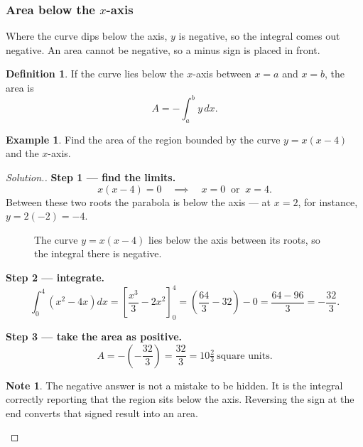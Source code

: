 \documentclass[11pt,a4paper]{article}
\theoremstyle{definition}
\newtheorem{definition}[thm]{Definition}
\newtheorem{example}[thm]{Example}
\newtheorem{note}[thm]{Note}
\newenvironment{solution}
  {\renewcommand{\qedsymbol}{}\begin{proof}[\textit{Solution}.]}
  {\end{proof}}
\begin{document}
\subsubsection{Area below the $x$-axis}

Where the curve dips below the axis, $y$ is negative, so the integral comes out
negative. An area cannot be negative, so a minus sign is placed in front.

\begin{definition}
If the curve lies below the $x$-axis between $x=a$ and $x=b$, the area is
$$A=-\int_a^b y\,dx.$$
\end{definition}

\begin{example}
Find the area of the region bounded by the curve $y=x(x-4)$ and the $x$-axis.
\end{example}

\begin{solution}
\textbf{Step 1 --- find the limits.}
$$x(x-4)=0\quad\implies\quad x=0\ \text{ or }\ x=4.$$
Between these two roots the parabola is below the axis --- at $x=2$, for instance,
$y=2(-2)=-4$.

\begin{figure}[H]
\centering
{}
\caption{The curve $y=x(x-4)$ lies below the axis between its roots, so the integral there is negative.}
\end{figure}

\textbf{Step 2 --- integrate.}
$$\int_0^4\left(x^2-4x\right)dx=\left[\frac{x^3}{3}-2x^2\right]_0^4
=\left(\frac{64}{3}-32\right)-0=\frac{64-96}{3}=-\frac{32}{3}.$$

\textbf{Step 3 --- take the area as positive.}
$$A=-\left(-\frac{32}{3}\right)=\frac{32}{3}=10\tfrac{2}{3}\ \text{square units}.$$

\begin{note}
The negative answer is not a mistake to be hidden. It is the integral correctly
reporting that the region sits below the axis. Reversing the sign at the end converts
that signed result into an area.
\end{note}
\end{solution}
\end{document}
